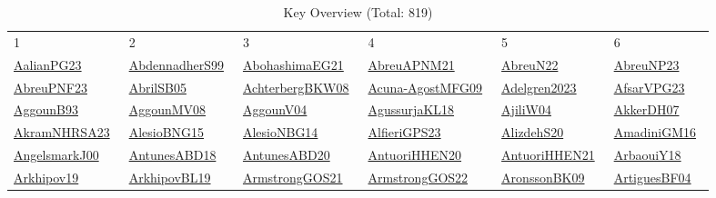 \begin{longtable}{*{6}{l}}
\rowcolor{white}\caption{Key Overview (Total: 819)}\\ \toprule
\rowcolor{white}1 & 2 & 3 & 4 & 5 & 6\\ \midrule
\endhead
\bottomrule
\endfoot
\href{../works/AalianPG23.pdf}{AalianPG23}~\cite{AalianPG23} & \href{../works/AbdennadherS99.pdf}{AbdennadherS99}~\cite{AbdennadherS99} & \href{../works/AbohashimaEG21.pdf}{AbohashimaEG21}~\cite{AbohashimaEG21} & \href{../works/AbreuAPNM21.pdf}{AbreuAPNM21}~\cite{AbreuAPNM21} & \href{../works/AbreuN22.pdf}{AbreuN22}~\cite{AbreuN22} & \href{../works/AbreuNP23.pdf}{AbreuNP23}~\cite{AbreuNP23}\\ 
\href{../works/AbreuPNF23.pdf}{AbreuPNF23}~\cite{AbreuPNF23} & \href{../works/AbrilSB05.pdf}{AbrilSB05}~\cite{AbrilSB05} & \href{../works/AchterbergBKW08.pdf}{AchterbergBKW08}~\cite{AchterbergBKW08} & \href{../works/Acuna-AgostMFG09.pdf}{Acuna-AgostMFG09}~\cite{Acuna-AgostMFG09} & \href{../works/Adelgren2023.pdf}{Adelgren2023}~\cite{Adelgren2023} & \href{../works/AfsarVPG23.pdf}{AfsarVPG23}~\cite{AfsarVPG23}\\ 
\href{../works/AggounB93.pdf}{AggounB93}~\cite{AggounB93} & \href{../}{AggounMV08}~\cite{AggounMV08} & \href{../}{AggounV04}~\cite{AggounV04} & \href{../works/AgussurjaKL18.pdf}{AgussurjaKL18}~\cite{AgussurjaKL18} & \href{../}{AjiliW04}~\cite{AjiliW04} & \href{../works/AkkerDH07.pdf}{AkkerDH07}~\cite{AkkerDH07}\\ 
\href{../works/AkramNHRSA23.pdf}{AkramNHRSA23}~\cite{AkramNHRSA23} & \href{../works/AlesioBNG15.pdf}{AlesioBNG15}~\cite{AlesioBNG15} & \href{../works/AlesioNBG14.pdf}{AlesioNBG14}~\cite{AlesioNBG14} & \href{../works/AlfieriGPS23.pdf}{AlfieriGPS23}~\cite{AlfieriGPS23} & \href{../}{AlizdehS20}~\cite{AlizdehS20} & \href{../works/AmadiniGM16.pdf}{AmadiniGM16}~\cite{AmadiniGM16}\\ 
\href{../works/AngelsmarkJ00.pdf}{AngelsmarkJ00}~\cite{AngelsmarkJ00} & \href{../works/AntunesABD18.pdf}{AntunesABD18}~\cite{AntunesABD18} & \href{../works/AntunesABD20.pdf}{AntunesABD20}~\cite{AntunesABD20} & \href{../works/AntuoriHHEN20.pdf}{AntuoriHHEN20}~\cite{AntuoriHHEN20} & \href{../works/AntuoriHHEN21.pdf}{AntuoriHHEN21}~\cite{AntuoriHHEN21} & \href{../works/ArbaouiY18.pdf}{ArbaouiY18}~\cite{ArbaouiY18}\\ 
\href{../}{Arkhipov19}~\cite{Arkhipov19} & \href{../works/ArkhipovBL19.pdf}{ArkhipovBL19}~\cite{ArkhipovBL19} & \href{../works/ArmstrongGOS21.pdf}{ArmstrongGOS21}~\cite{ArmstrongGOS21} & \href{../works/ArmstrongGOS22.pdf}{ArmstrongGOS22}~\cite{ArmstrongGOS22} & \href{../works/AronssonBK09.pdf}{AronssonBK09}~\cite{AronssonBK09} & \href{../works/ArtiguesBF04.pdf}{ArtiguesBF04}~\cite{ArtiguesBF04}\\ 

\end{longtable}
